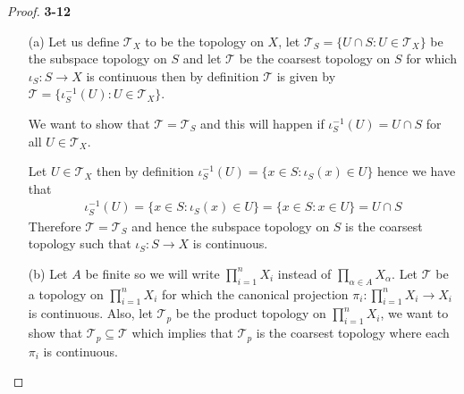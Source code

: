 \documentclass[11pt]{article}
\newcommand{\Topo}{\mathcal{T}}
\theoremstyle{definition}
\begin{document}
\cleardoublepage
\begin{proof}{\textbf{3-12}}
\begin{itemize}
    \item [(a)] Let us define $\Topo_X$ to be the topology on $X$,
    let $\Topo_S = \{U \cap S : U\in \Topo_X\}$ be the subspace topology on $S$ and let $\Topo$ be
    the coarsest topology on $S$ for which $\iota_S: S \to X$ is continuous
    then by definition $\Topo$ is given by
    $\Topo = \{\iota_S^{-1}(U): U \in \Topo_X\}$.
    
    We want to show that $\Topo = \Topo_S$ and this will happen if
    $\iota_S^{-1}(U) = U \cap S$ for all $U \in \Topo_X$.

    Let $U \in \Topo_X$ then by definition
    $\iota_S^{-1}(U) = \{x \in S : \iota_S(x) \in U\}$
    hence we have that
    \begin{align*}
        \iota_S^{-1}(U) = \{x \in S : \iota_S(x) \in U\}
        = \{x \in S : x \in U\} = U \cap S
    \end{align*}
    Therefore $\Topo = \Topo_S$ and hence the subspace topology on $S$
    is the coarsest topology such that $\iota_S : S \to X$ is continuous.    

    \item [(b)] Let $A$ be finite so we will write $\prod_{i=1}^n X_i$
    instead of $\prod_{\alpha \in A} X_\alpha$.
    Let $\Topo$ be a topology on
    $\prod_{i=1}^n X_i$ for which the canonical projection
    $\pi_i: \prod_{i=1}^n X_i \to X_i$ is continuous.
    Also, let $\Topo_p$ be the product topology on
    $\prod_{i=1}^n X_i$, we want to show that $\Topo_p \subseteq \Topo$
    which implies that $\Topo_p$ is the coarsest topology where each $\pi_i$
    is continuous.


\end{itemize}
\end{proof}
\end{document}

